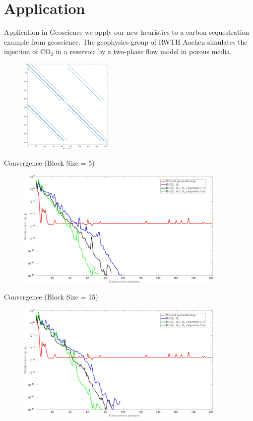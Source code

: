 \documentclass{beamer}
\begin{document}
\section{Application}
\begin{frame}{Application in Geoscience}
we apply our new heuristics to a carbon sequestration example from geoscience.
The geophysics group of RWTH Aachen simulates the injection of CO$_2$ in a reservoir by a
two-phase flow model in porous media.
\begin{figure}
\centering
\includegraphics[width=0.4\textwidth]{co2_jac}
\end{figure}
\end{frame}

\begin{frame}{Convergence (Block Size = 5)}
\begin{figure}
\centering
\includegraphics[width=0.9\textwidth]{jac_convergence_greedy_new_5}
\end{figure}
\end{frame}

\begin{frame}{Convergence (Block Size = 15)}
\begin{figure}
\centering
\includegraphics[width=0.9\textwidth]{jac_convergence_greedy_new_15}
\end{figure}
\end{frame}
\end{document}
